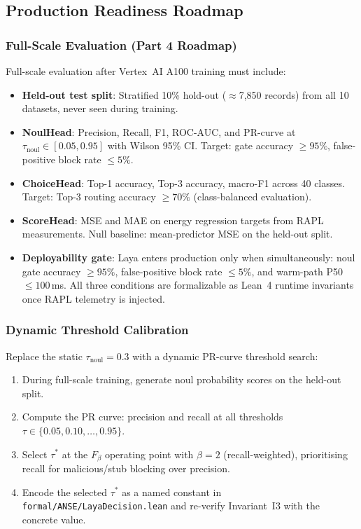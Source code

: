 \documentclass[conference]{IEEEtran}
\begin{document}
\subsection{Production Readiness Roadmap}
\label{sec:future}

\subsubsection{Full-Scale Evaluation (Part 4 Roadmap)}

Full-scale evaluation after Vertex~AI A100 training must include:
\begin{itemize}
  \item \textbf{Held-out test split}: Stratified 10\% hold-out ($\approx$7{,}850 records) from
        all 10 datasets, never seen during training.
  \item \textbf{NoulHead}: Precision, Recall, F1, ROC-AUC, and PR-curve at
        $\tau_\text{noul} \in [0.05, 0.95]$ with Wilson 95\% CI.
        Target: gate accuracy $\geq 95\%$, false-positive block rate $\leq 5\%$.
  \item \textbf{ChoiceHead}: Top-1 accuracy, Top-3 accuracy, macro-F1 across 40 classes.
        Target: Top-3 routing accuracy $\geq 70\%$ (class-balanced evaluation).
  \item \textbf{ScoreHead}: MSE and MAE on energy regression targets from RAPL measurements.
        Null baseline: mean-predictor MSE on the held-out split.
  \item \textbf{Deployability gate}: Laya enters production only when simultaneously:
        noul gate accuracy $\geq 95\%$, false-positive block rate $\leq 5\%$,
        and warm-path P50 $\leq 100$\,ms. All three conditions are formalizable as
        Lean~4 runtime invariants once RAPL telemetry is injected.
\end{itemize}

\subsubsection{Dynamic Threshold Calibration}

Replace the static $\tau_\text{noul}{=}0.3$ with a dynamic PR-curve threshold search:
\begin{enumerate}
  \item During full-scale training, generate noul probability scores on the held-out split.
  \item Compute the PR curve: precision and recall at all thresholds
        $\tau \in \{0.05, 0.10, \ldots, 0.95\}$.
  \item Select $\tau^*$ at the $F_\beta$ operating point with $\beta{=}2$ (recall-weighted),
        prioritising recall for malicious/stub blocking over precision.
  \item Encode the selected $\tau^*$ as a named constant in \texttt{formal/ANSE/LayaDecision.lean}
        and re-verify Invariant~I3 with the concrete value.
\end{enumerate}
\end{document}
